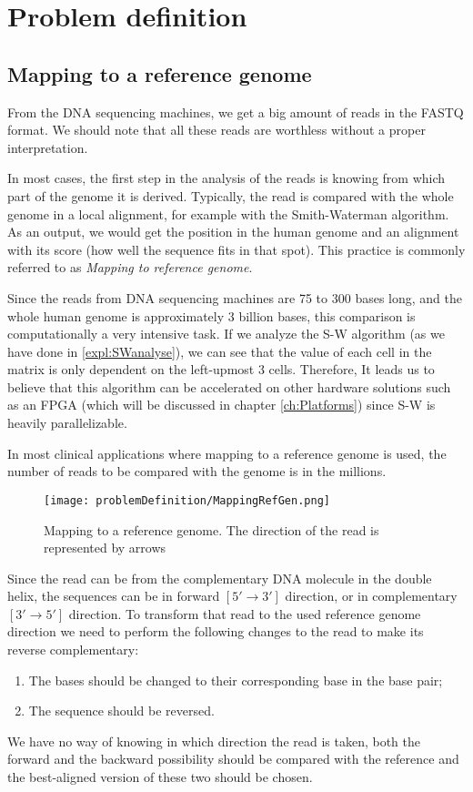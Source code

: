 \section{Problem definition}

\subsection{Mapping to a reference genome}

From the DNA sequencing machines, we get a big amount of reads in the FASTQ format. We should note that all these reads are worthless without a proper interpretation.

In most cases, the first step in the analysis of the reads is knowing from which part of the genome it is derived. Typically, the read is compared with the whole genome in a local alignment, for example with the Smith-Waterman algorithm. As an output, we would get the position in the human genome and an alignment with its score (how well the sequence fits in that spot). This practice is commonly referred to as \emph{Mapping to reference genome}.

Since the reads from DNA sequencing machines are 75 to 300 bases long, and the whole human genome is approximately 3 billion bases, this comparison is computationally a very intensive task. If we analyze the S-W algorithm (as we have done in \ref{expl:SWanalyse}), we can see that the value of each cell in the matrix is only dependent on the left-upmost 3 cells. Therefore, It leads us to believe that this algorithm can be accelerated on other hardware solutions such as an FPGA (which will be discussed in chapter \ref{ch:Platforms}) since S-W is heavily parallelizable.

In most clinical applications where mapping to a reference genome is used, the number of reads to be compared with the genome is in the millions.

\begin{figure}[H]
	\centering
	\texttt{[image: problemDefinition/MappingRefGen.png]}
	\caption{Mapping to a reference genome. The direction of the read is represented by arrows}
	\label{fig:mapRefGen}
\end{figure}

Since the read can be from the complementary DNA molecule in the double helix, the sequences can be in forward $[5' \rightarrow 3']$ direction, or in complementary $[3' \rightarrow 5']$ direction. To transform that read to the used reference genome direction we need to perform the following changes to the read to make its reverse complementary:
\begin{enumerate}
	\item The bases should be changed to their corresponding base in the base pair;
	\item The sequence should be reversed.
\end{enumerate}
We have no way of knowing in which direction the read is taken, both the forward and the backward possibility should be compared with the reference and the best-aligned version of these two should be chosen.

